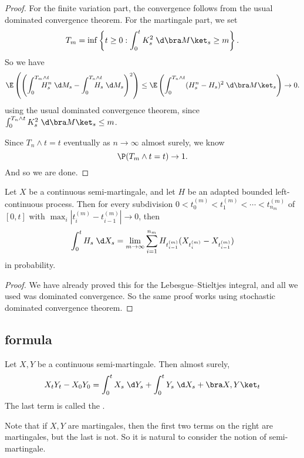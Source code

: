 \documentclass[a4paper]{article}
\begin{document}
\begin{proof}
  For the finite variation part, the convergence follows from the usual dominated convergence theorem. For the martingale part, we set
  \[
    T_m = \inf \left\{t \geq 0: \int_0^t K_s^2 \;\d \bra M\ket_s \geq m\right\}.
  \]
  So we have
  \[
    \E \left(\left(\int_0^{T_m \wedge t}\hspace{-13pt}H_s^n \;\d M_s - \int_0^{T_n \wedge t}\hspace{-13pt}H_s\;\d M_s\right)^2\right) \leq \E \left(\int_0^{T_n \wedge t}\vspace{-13pt}(H_s^n- H_s)^2 \;\d \bra M\ket_s\right) \to 0.
  \]
  using the usual dominated convergence theorem, since $\int_0^{T_n \wedge t} K_s^2 \;\d \bra M\ket_s \leq m$.

  Since $T_n \wedge t = t$ eventually as $n \to \infty$ almost surely, we know
  \[
    \P(T_m \wedge t = t) \to 1.
  \]
  And so we are done.
\end{proof}

\begin{prop}
  Let $X$ be a continuous semi-martingale, and let $H$ be an adapted bounded left-continuous process. Then for every subdivision $0 < t_0^{(m)} < t_1^{(m)} < \cdots < t_{n_m}^{(m)}$ of $[0, t]$ with $\max_i |t_i^{(m)} - t_{i - 1}^{(m)}| \to 0$, then
  \[
    \int_0^t H_s \;\d X_s = \lim_{m \to \infty} \sum_{i = 1}^{n_m} H_{t_{i - 1}^{(m)}} (X_{t_i^{(m)}} - X_{t_{i - 1}^{(m)}})
  \]
  in probability.
\end{prop}

\begin{proof}
  We have already proved this for the Lebesgue--Stieltjes integral, and all we used was dominated convergence. So the same proof works using stochastic dominated convergence theorem.
\end{proof}

\subsection{ formula}
\begin{thm}
  Let $X, Y$ be a continuous semi-martingale. Then almost surely,
  \[
    X_t Y_t - X_0 Y_0 = \int_0^t X_s \;\d Y_s + \int_0^t Y_s\;\d X_s + \bra X, Y\ket_t
  \]
  The last term is called the .
\end{thm}
Note that if $X, Y$ are martingales, then the first two terms on the right are martingales, but the last is not. So it is natural to consider the notion of semi-martingale.
\end{document}

